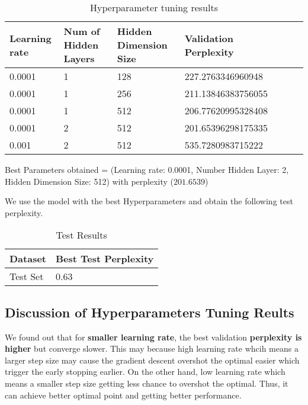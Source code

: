 \documentclass{article}
\begin{document}
\begin{table}[htb]
	\caption{Hyperparameter tuning results}
	\label{sample-table}
	\centering
	\begin{tabular}{lllllll}
		\toprule
		\cmidrule{1-4}
		Learning rate & Num of Hidden Layers & Hidden Dimension Size & Validation Perplexity\\
		\midrule
		0.0001 & 1 & 128 & 227.2763346960948 \\
		0.0001 & 1  & 256 & 211.13846383756055  \\
		0.0001 & 1  & 512 & 206.77620995328408  \\
		0.0001 & 2 & 512 & 201.65396298175335  \\
		0.001 & 2  & 512 & 535.7280983715222  \\
		\bottomrule
	\end{tabular}
\end{table}

Best Parameters obtained = (Learning rate: 0.0001, Number Hidden Layer: 2, Hidden Dimension Size: 512) with perplexity ($201.6539$)

We use the model with the best Hyperparameters and obtain the following test perplexity.

\pagebreak

\begin{table}[htb]
	\caption{Test Results}
	\label{sample-table}
	\centering
	\begin{tabular}{ll}
		\toprule
		\cmidrule{1-2}
		Dataset & Best Test Perplexity\\
		\midrule
		Test Set & 0.63   \\
		\bottomrule
	\end{tabular}
\end{table}

\subsection{Discussion of Hyperparameters Tuning Reults}

We found out that for \textbf{smaller learning rate}, the best validation \textbf{perplexity is higher} but converge slower. This may because high learning rate whcih means a larger step size may cause the gradient descent overshot the optimal easier which trigger the early stopping earlier. On the other hand, low learning rate which means a smaller step size getting less chance to overshot the optimal. Thus, it can achieve better optimal point and getting better performance.
\end{document}
